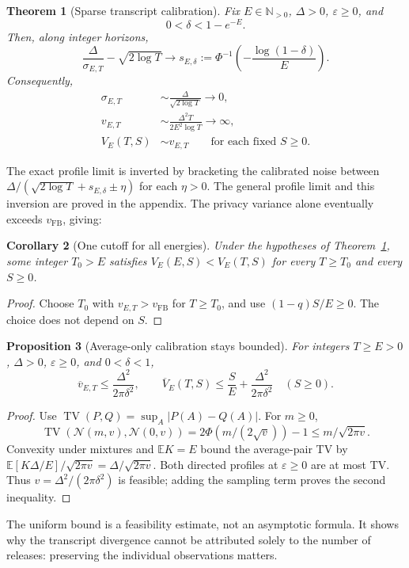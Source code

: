 \documentclass[11pt]{article}
\newtheorem{theorem}{Theorem}[section]
\newtheorem{proposition}[theorem]{Proposition}
\newtheorem{corollary}[theorem]{Corollary}
\theoremstyle{remark}
\newcommand{\N}{\mathbb N}
\newcommand{\E}{\mathbb E}
\newcommand{\Normal}{\mathcal N}
\newcommand{\TV}{\operatorname{TV}}
\begin{document}
\begin{theorem}[Sparse transcript calibration]\label{thm:smallbatch}
Fix $E\in\N_{>0}$, $\Delta>0$, $\varepsilon\geq0$, and
\begin{equation}\label{eq:interior}
 0<\delta<1-e^{-E}.
\end{equation}
Then, along integer horizons,
\[
 \frac\Delta{\sigma_{E,T}}-\sqrt{2\log T}
 \longrightarrow s_{E,\delta}:=
 \Phi^{-1}\!\left(-\frac{\log(1-\delta)}E\right).
\]
Consequently,
\begin{align}
 \sigma_{E,T}&\sim\frac\Delta{\sqrt{2\log T}}\longrightarrow0,
 \label{eq:sigmaasymptotic}\\
 v_{E,T}&\sim\frac{\Delta^2T}{2E^2\log T}\longrightarrow\infty,
 \label{eq:privacydivergence}\\
 V_E(T,S)&\sim v_{E,T}\qquad\text{for each fixed }S\geq0.
 \label{eq:total-equivalent}
\end{align}
\end{theorem}
The exact profile limit is inverted by bracketing the calibrated noise between
$\Delta/(\sqrt{2\log T}+s_{E,\delta}\pm\eta)$ for each $\eta>0$.
The general profile limit and this inversion are proved in the appendix.
The privacy variance alone eventually exceeds $v_{\mathrm{FB}}$, giving:
\begin{corollary}[One cutoff for all energies]\label{cor:eventual}
Under the hypotheses of Theorem~\ref{thm:smallbatch}, some integer $T_0>E$
satisfies $V_E(E,S)<V_E(T,S)$ for every $T\geq T_0$ and every $S\geq0$.
\end{corollary}
\begin{proof}
Choose $T_0$ with $v_{E,T}>v_{\mathrm{FB}}$ for $T\geq T_0$, and use
$(1-q)S/E\geq0$. The choice does not depend on $S$.
\end{proof}

\begin{proposition}[Average-only calibration stays bounded]\label{prop:average-uniform-bound}
For integers $T\geq E>0$, $\Delta>0$, $\varepsilon\geq0$, and $0<\delta<1$,
\[
 \overline v_{E,T}\leq\frac{\Delta^2}{2\pi\delta^2},\qquad
 \overline V_E(T,S)\leq\frac SE+\frac{\Delta^2}{2\pi\delta^2}\quad(S\geq0).
\]
\end{proposition}
\begin{proof}
Use $\TV(P,Q)=\sup_A|P(A)-Q(A)|$. For $m\geq0$,
\[
 \TV(\Normal(m,v),\Normal(0,v))
 =2\Phi(m/(2\sqrt v))-1\leq m/\sqrt{2\pi v}.
\]
Convexity under mixtures and $\E K=E$ bound the average-pair TV by
$\E[K\Delta/E]/\sqrt{2\pi v}=\Delta/\sqrt{2\pi v}$.
Both directed profiles at $\varepsilon\geq0$ are at most TV. Thus
$v=\Delta^2/(2\pi\delta^2)$ is feasible; adding the sampling term proves
the second inequality.
\end{proof}
The uniform bound is a feasibility estimate, not an asymptotic formula.
It shows why the transcript divergence cannot be attributed solely to the
number of releases: preserving the individual observations matters.
\end{document}
